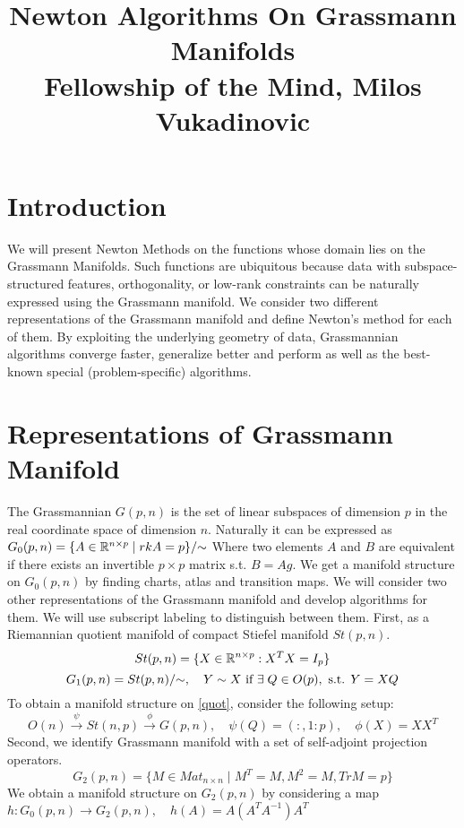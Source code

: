 \documentclass[a4paper]{article}
\title{\vspace{-6em} Newton Algorithms On Grassmann Manifolds \\  Fellowship of the Mind, Milos Vukadinovic  \vspace{-3em} }
\date{}
\begin{document}
\maketitle %
\section{Introduction}
We will present Newton Methods on the functions whose domain lies on the Grassmann Manifolds. 
Such functions are ubiquitous because data with subspace-structured
features, orthogonality, or low-rank constraints can be
naturally expressed using the Grassmann manifold.
We consider two different representations of the
Grassmann manifold and define Newton's method for each of them.
By exploiting the underlying geometry of data, Grassmannian algorithms
converge faster, generalize better and perform as well as the best-known 
special (problem-specific) algorithms. 
\section{Representations of Grassmann Manifold}
The Grassmannian $G(p,n)$ is the set of linear subspaces of dimension $p$
in the real coordinate space of dimension $n$. Naturally it can be expressed as $G_0(p,n) = \{ A \in \mathbb{R}^{n \times p} \; | \; rk A = p \}/{\sim} $
Where two elements $A$ and $B$ are equivalent if there exists an invertible $p \times p$ matrix s.t. $B=Ag$. We get a manifold structure on $G_0(p,n)$ by finding charts, atlas and transition maps.
We will consider two other representations of the Grassmann manifold and develop algorithms for them. We will use subscript labeling to distinguish between them.
First, as a Riemannian quotient manifold of compact Stiefel manifold $St(p,n)$.
$$
 St(p,n) = \{ X \in \mathbb{R}^{n \times p} : X^T X = I_p \} 
$$
\begin{equation} \label{quot}
 G_1(p,n) = St(p,n)/{\sim}, \quad  Y \sim X \text{ if } \exists \; Q \in O(p), \text{ s.t. } Y=XQ 
\end{equation}
To obtain a manifold structure on \ref{quot}, consider the following setup:
$$ O(n) \stackrel{\psi}{\to}  St(n,p) \stackrel{\phi}{\to} G(p,n), \quad \psi(Q) = (:,1:p), \quad \phi(X) = X X^T$$
Second, we identify Grassmann manifold with a set of self-adjoint projection operators.
\begin{equation}\label{proj}
G_{2}(p,n) = \{ M \in Mat_{n \times n} \; | \; M^T = M, M^2 = M, TrM=p \}
\end{equation}
We obtain a manifold structure on $G_{2}(p,n)$ by considering a map $h: G_0(p,n) \to G_2(p,n), \quad h(A) = A(A^T A^{-1}) A^T$ 
\end{document}
